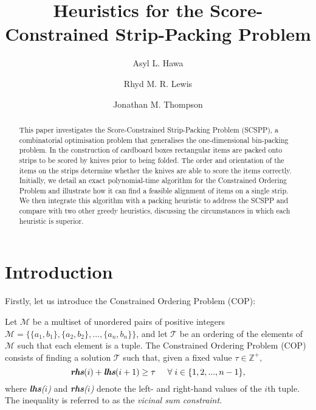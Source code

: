 \documentclass[oribibl]{llncs}
\begin{document}
	
\title{Heuristics for the Score-Constrained Strip-Packing Problem}
\author{Asyl L. Hawa \and Rhyd M. R. Lewis \and Jonathan M. Thompson}
\maketitle


\begin{abstract}
	This paper investigates the Score-Constrained Strip-Packing Problem (SCSPP), a combinatorial optimisation problem that generalises the one-dimensional bin-packing problem. In the construction of cardboard boxes rectangular items are packed onto strips to be scored by knives prior to being folded. The order and orientation of the items on the strips determine whether the knives are able to score the items correctly. Initially, we detail an exact polynomial-time algorithm for the Constrained Ordering Problem and illustrate how it can find a feasible alignment of items on a single strip. We then integrate this algorithm with a packing heuristic to address the SCSPP and compare with two other greedy heuristics, discussing the circumstances in which each heuristic is superior.
\end{abstract}


\section{Introduction}
\label{sec:intro}
Firstly, let us introduce the Constrained Ordering Problem (COP):

\begin{definition}
	\label{defn:cop}
	Let $\mathcal{M}$ be a multiset of unordered pairs of positive integers $\mathcal{M} = \{\{a_1, b_1\}, \{a_2,b_2\},...,\{a_n,b_n\}\}$, and let $\mathcal{T}$ be an ordering of the elements of $\mathcal{M}$ such that each element is a tuple. The Constrained Ordering Problem (COP) consists of finding a solution $\mathcal{T}$ such that, given a fixed value $\tau \in \mathbb{Z}^{+},$
	\begin{equation}
		\label{eqn:vsc}
		\emph{\textbf{rhs}}(i) + \emph{\textbf{lhs}}(i+1) \geq \tau \hspace{5mm} \forall \hspace{1mm} i \in \{1,2,..., n-1\},
	\end{equation}
	where \emph{\textbf{lhs}($i$)} and \emph{\textbf{rhs}($i$)} denote the left- and right-hand values of the $i$th tuple. The inequality is referred to as the \emph{vicinal sum constraint}.
\end{definition}
\end{document}
